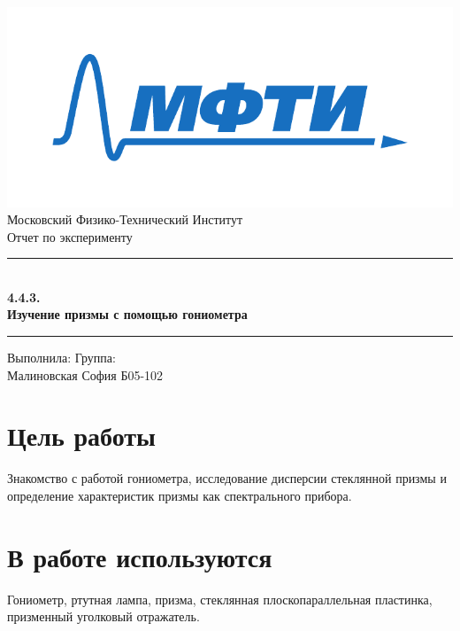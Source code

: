 \documentclass[a4paper,12pt]{article}
\begin{document}
\begin{titlepage}
		\vspace*{\fill}
		
		\begin{center}
			\includegraphics[scale=0.8]{MIPT.pdf}
			\\[0.7cm]\Huge Московский Физико-Технический Институт
			\\[2cm]\LARGE Отчет по эксперименту
			\\[0.5cm]\noindent\rule{\textwidth}{1pt}
			\\\Huge\textbf{4.4.3. \\ Изучение призмы с помощью гониометра}
			\\[-0.5cm]\noindent\rule{\textwidth}{1pt}
		\end{center}
		
		\vspace*{\fill}
		
		\begin{flushleft}
			Выполнила: \hspace{\fill} Группа:
			\\Малиновская София \hspace{\fill} Б05-102
		\end{flushleft}
	\end{titlepage}

	\setcounter{page}{2}


\section*{Цель работы} 
Знакомство с работой гониометра, исследование дисперсии стеклянной призмы и определение характеристик призмы как спектрального прибора.


\section*{В работе используются}
Гониометр, ртутная лампа, призма, стеклянная плоскопараллельная пластинка, призменный уголковый отражатель.
\end{document}
